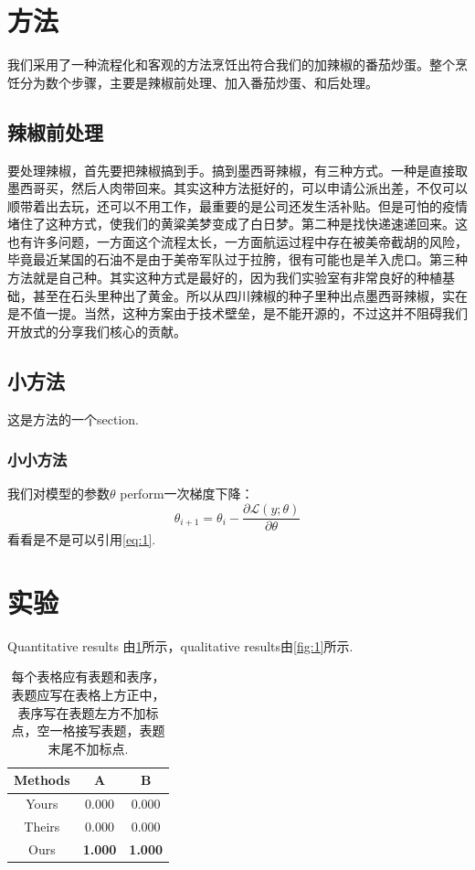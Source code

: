 \newpage
\section{方法}
我们采用了一种流程化和客观的方法烹饪出符合我们的加辣椒的番茄炒蛋。整个烹饪分为数个步骤，主要是辣椒前处理、加入番茄炒蛋、和后处理。

\subsection{辣椒前处理}
要处理辣椒，首先要把辣椒搞到手。搞到墨西哥辣椒，有三种方式。一种是直接取墨西哥买，然后人肉带回来。其实这种方法挺好的，可以申请公派出差，不仅可以顺带着出去玩，还可以不用工作，最重要的是公司还发生活补贴。但是可怕的疫情堵住了这种方式，使我们的黄粱美梦变成了白日梦。第二种是找快递速递回来。这也有许多问题，一方面这个流程太长，一方面航运过程中存在被美帝截胡的风险，毕竟最近某国的石油不是由于美帝军队过于拉胯，很有可能也是羊入虎口。第三种方法就是自己种。其实这种方式是最好的，因为我们实验室有非常良好的种植基础，甚至在石头里种出了黄金。所以从四川辣椒的种子里种出点墨西哥辣椒，实在是不值一提。当然，这种方案由于技术壁垒，是不能开源的，不过这并不阻碍我们开放式的分享我们核心的贡献。

\subsection{小方法}
这是方法的一个section.
\subsubsection{小小方法}


我们对模型的参数$\theta$ perform一次梯度下降：
\begin{equation}
\label{eq:1}
    \theta_{i+1}=\theta_{i}-\frac{\partial \mathcal{L}(y;\theta)}{\partial \theta}
\end{equation}
看看是不是可以引用\cref{eq:1}.


\newpage
\section{实验}
Quantitative results 由\cref{tab:1}所示，qualitative results由\cref{fig:1}所示.


\begin{table}[ht]
    \centering
    \caption{每个表格应有表题和表序，表题应写在表格上方正中，表序写在表题左方不加标点，空一格接写表题，表题末尾不加标点.}
    \label{tab:1}
    \begin{tabular}{ccc}
    \toprule
    \textbf{Methods} & \textbf{A} & \textbf{B} \\
    \midrule
    Yours & 0.000 & 0.000 \\
    Theirs & 0.000 & 0.000 \\
    Ours & \textbf{1.000} & \textbf{1.000} \\ 
    \bottomrule
    \end{tabular}
\end{table}

